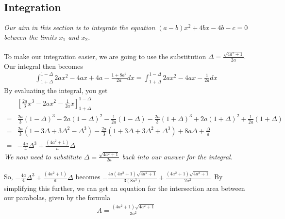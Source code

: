 \documentclass[a4paper,11pt]{article}
\theoremstyle{definition}
\begin{document}
\subsection{Integration}
\textit{Our aim in this section is to integrate the equation $(a-b)x^2+4bx-4b-c=0$ between the limits $x_1$ and $x_2$.}\\
\\To make our integration easier, we are going to use the substitution $\Delta=\frac{\sqrt{4a^2+1}}{2a}$. Our integral then becomes
\begin{align*}
    \int_{1+\Delta}^{1-\Delta}2ax^2-4ax+4a-\frac{1+8a^2}{2a} dx =\int_{1+\Delta}^{1-\Delta}2ax^2-4ax-\frac{1}{2a}dx
\end{align*}
By evaluating the integral, you get 
\begin{align*}
  &\left[\frac{2a}{3}x^3-2ax^2-\frac{1}{2a}x \right]_{1+\Delta}^{1-\Delta}\\
  =&\frac{2a}{3}(1-\Delta)^3-2a(1-\Delta)^2-\frac{1}{2a}(1-\Delta)-\frac{2a}{3}(1+\Delta)^3+2a(1+\Delta)^2+\frac{1}{2a}(1+\Delta)\\
  =&\frac{2a}{3}(1-3\Delta+3\Delta^2-\Delta^3)-\frac{2a}{3}(1+3\Delta+3\Delta^2+\Delta^3)+8a\Delta+\frac{\Delta}{a}\\
  =&-\frac{4a}{4}\Delta^3+\frac{(4a^2+1)}{a}\Delta
\end{align*}
\textit{We now need to substitute $\Delta=\frac{\sqrt{4a^2+1}}{2a}$ back into our answer for the integral.}\\
\\So, $-\frac{4a}{4}\Delta^3+\frac{(4a^2+1)}{a}\Delta$ becomes $-\frac{4a(4a^2+1)\sqrt{4a^2+1}}{3(8a^3)}+\frac{(4a^2+1)\sqrt{4a^2+1}}{2a^2}$. By simplifying this further, we can get an equation for the intersection area between our parabolas, given by the formula
\begin{align*}
    A=\frac{(4a^2+1)\sqrt{4a^2+1}}{3a^2}
\end{align*}
\end{document}
